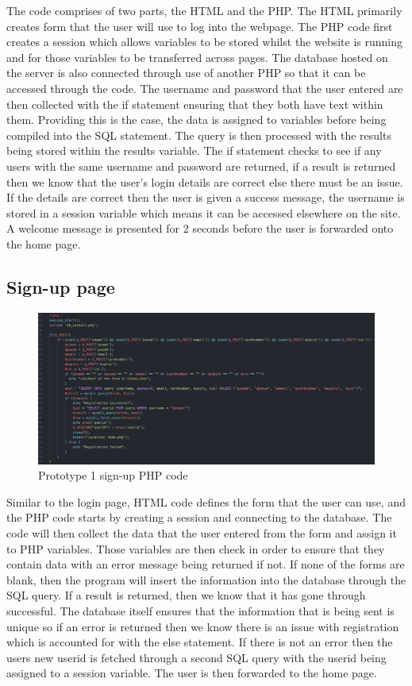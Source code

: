 The code comprises of two parts, the HTML and the PHP. The HTML primarily creates form that the user will use to log into the webpage. The PHP code first creates a session which allows variables to be stored whilst the website is running and for those variables to be transferred across pages. The database hosted on the server is also connected through use of another PHP so that it can be accessed through the code. The username and password that the user entered are then collected with the if statement ensuring that they both have text within them. Providing this is the case, the data is assigned to variables before being compiled into the SQL statement. The query is then processed with the results being stored within the results variable. The if statement checks to see if any users with the same username and password are returned, if a result is returned then we know that the user’s login details are correct else there must be an issue. If the details are correct then the user is given a success message, the username is stored in a session variable which means it can be accessed elsewhere on the site. A welcome message is presented for 2 seconds before the user is forwarded onto the home page. 

\subsection{Sign-up page}
\begin{figure}[H]
    \centering
    \includegraphics[scale=0.4]{ch3_developing/proto1/pro1_register.png}
    \caption{Prototype 1 sign-up PHP code}
    \label{fig:pro1_register}
\end{figure}
Similar to the login page, HTML code defines the form that the user can use, and the PHP code starts by creating a session and connecting to the database. The code will then collect the data that the user entered from the form and assign it to PHP variables. Those variables are then check in order to ensure that they contain data with an error message being returned if not. If none of the forms are blank, then the program will insert the information into the database through the SQL query. If a result is returned, then we know that it has gone through successful. The database itself ensures that the information that is being sent is unique so if an error is returned then we know there is an issue with registration which is accounted for with the else statement. If there is not an error then the users new userid is fetched through a second SQL query with the userid being assigned to a session variable. The user is then forwarded to the home page. 
